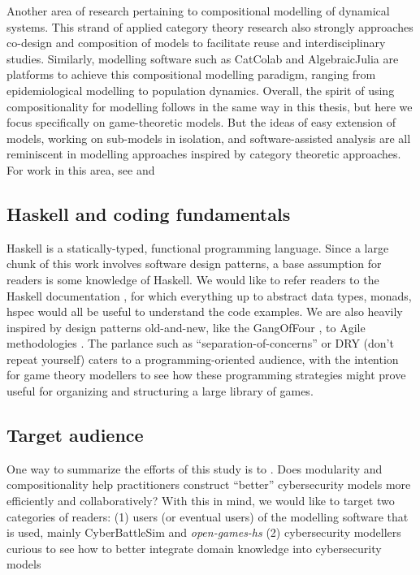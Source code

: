 \documentclass[11pt,titlepage,dvipsnames,table,xcdraw,english]{article}
\begin{document}
Another area of research pertaining to compositional modelling of dynamical systems. This strand of applied category theory research also strongly approaches co-design and composition of models to facilitate reuse and interdisciplinary studies. Similarly, modelling software such as CatColab \cite{catcolab2024} and AlgebraicJulia are platforms to achieve this compositional modelling paradigm, ranging from epidemiological modelling to population dynamics. Overall, the spirit of using compositionality for modelling follows in the same way in this thesis, but here we focus specifically on game-theoretic models. But the ideas of easy extension of models, working on sub-models in isolation, and software-assisted analysis are all reminiscent in modelling approaches inspired by category theoretic approaches. For work in this area, see \cite{baezCategoricalFrameworkModeling2023}and \cite{liCompositionalSystemDynamics2025}


\subsection{Haskell and coding fundamentals}

Haskell is a statically-typed, functional programming language. Since a large chunk of this work involves software design patterns, a base assumption for readers is some knowledge of Haskell. We would like to refer readers to the Haskell documentation \cite{haskelldocs}, for which everything up to abstract data types, monads, hspec would all be useful to understand the code examples. We are also heavily inspired by design patterns old-and-new, like the GangOfFour \cite{gamma1994design}, to Agile methodologies \cite{beck2001agile}. The parlance such as ``separation-of-concerns'' or DRY (don't repeat yourself) caters to a programming-oriented audience, with the intention for game theory modellers to see how these programming strategies might prove useful for organizing and structuring a large library of games.  



\subsection{Target audience}

One way to summarize the efforts of this study is to . Does modularity and compositionality help practitioners construct ``better'' cybersecurity models more efficiently and collaboratively? With this in mind, we would like to target two categories of readers: (1) users (or eventual users) of the modelling software that is used, mainly CyberBattleSim and \textit{open-games-hs} (2) cybersecurity modellers curious to see how to better integrate domain knowledge into cybersecurity models  
\end{document}

